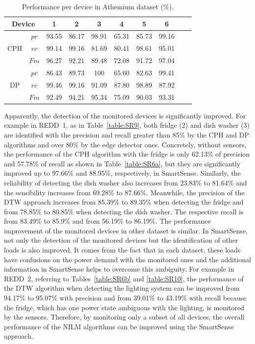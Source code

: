 \begin{table}
\caption{Performance per device in Athemium dataset ($\%$).}\label{table:SR12}
\begin{center}
\begin{tabular}{|c|c|c|c|c|c|c|c|c|c|}
\hline
\multicolumn{2}{|c|}{Device}& 1&2&3&4&5&6\\
\hline
\multirow{3}{*}{CPH} & $pr$ & 93.55 & 86.17& 98.91 &65.31 &85.73 &99.16 \\
& $rc$ &99.14 &99.16 &81.69 &80.41 &98.61 &95.01  \\
& $Fm$ &96.27 &92.21 &89.48 &72.08 &91.72 &97.04  \\
\hline
\multirow{3}{*}{DP} & $pr$ & 86.43 &89.73 &100 &65.60 &82.63 &99.41 \\
& $rc$ & 99.46&99.16 &91.09 &87.80 &98.89 &87.92   \\
& $Fm$ & 92.49&94.21 &95.34 &75.09 &90.03 &93.31 \\
\hline
\end{tabular}
\end{center}
\end{table}

Apparently, the detection of the monitored devices is significantly improved.  For example in REDD~1, as in Table~\ref{table:SR9}, both fridge (2) and dish washer (3) are identified with the precision and recall greater than 85$\%$ by the CPH and DP algorithms and over 80$\%$ by the edge detector ones. Concretely, without sensors, the performance of the CPH algorithm with the fridge is only 62.13$\%$ of precision and 57.78$\%$ of recall as shown in Table~\ref{table:SR6a}, but they are significantly improved up to 97.66$\%$ and 88.95$\%$, respectively, in SmartSense. Similarly, the reliability of detecting the dish washer also increases from 23.83$\%$ to 81.64$\%$ and the sensibility increases from 69.28$\%$ to 87.66$\%$. Meanwhile, the precision of the DTW approach increases from 85.39$\%$ to 89.35$\%$ when detecting the fridge and from 78.85$\%$ to 80.85$\%$ when detecting the dish washer. The respective recall is from 83.49$\%$ to 85.9$\%$ and from 56.19$\%$ to 86.19$\%$. The performance improvement of the monitored devices in other dataset is similar.
In SmartSense, not only the detection of the monitored devices but the identification of other loads is also improved. It comes from the fact that in each dataset, these loads have confusions on the power demand with the monitored ones and the additional information in SmartSense helps to overcome this ambiguity.
For example in REDD~2, referring to Tables~\ref{table:SR6b} and \ref{table:SR10}, the performance of the DTW algorithm when detecting the lighting system can be improved from 94.17$\%$ to 95.07$\%$ with precision and from 39.01$\%$ to 43.19$\%$ with recall because the fridge, which has one power state ambiguous with the lighting, is monitored by the sensors. Therefore, by monitoring only a subset of all devices, the overall performance of the NILM algorithms can be improved using the SmartSense approach.




